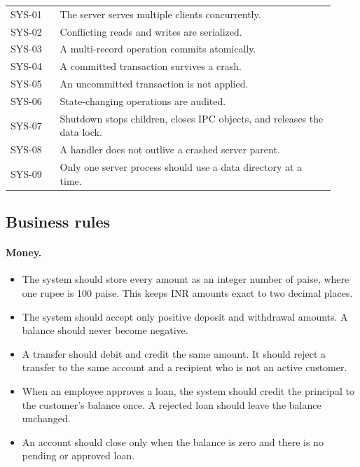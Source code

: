 \documentclass[11pt,a4paper]{article}
\begin{document}
\begin{longtable}{L{0.14\linewidth}L{0.78\linewidth}}
\hline
SYS-01 & The server serves multiple clients concurrently. \\
SYS-02 & Conflicting reads and writes are serialized. \\
SYS-03 & A multi-record operation commits atomically. \\
SYS-04 & A committed transaction survives a crash. \\
SYS-05 & An uncommitted transaction is not applied. \\
SYS-06 & State-changing operations are audited. \\
SYS-07 & Shutdown stops children, closes IPC objects, and releases the data lock. \\
SYS-08 & A handler does not outlive a crashed server parent. \\
SYS-09 & Only one server process should use a data directory at a time. \\
\hline
\end{longtable}

\subsection{Business rules}

\paragraph{Money.}
\begin{itemize}
\item The system should store every amount as an integer number of paise, where one rupee is 100 paise. This keeps INR amounts exact to two decimal places.
\item The system should accept only positive deposit and withdrawal amounts. A balance should never become negative.
\item A transfer should debit and credit the same amount. It should reject a transfer to the same account and a recipient who is not an active customer.
\item When an employee approves a loan, the system should credit the principal to the customer's balance once. A rejected loan should leave the balance unchanged.
\item An account should close only when the balance is zero and there is no pending or approved loan.
\end{itemize}
\end{document}

